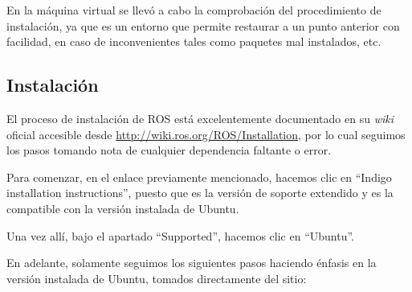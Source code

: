 En la máquina virtual se llevó a cabo la comprobación del procedimiento de instalación, ya que es un entorno que permite restaurar a un punto anterior con facilidad, en caso de inconvenientes tales como paquetes mal instalados, etc.

\subsection{Instalación}

El proceso de instalación de ROS está excelentemente documentado en su \textit{wiki} oficial accesible desde \url{http://wiki.ros.org/ROS/Installation}, por lo cual seguimos los pasos tomando nota de cualquier dependencia faltante o error.

Para comenzar, en el enlace previamente mencionado, hacemos clic en ``Indigo installation instructions'', puesto que es la versión de soporte extendido y es la compatible con la versión instalada de Ubuntu.

Una vez allí, bajo el apartado ``Supported'', hacemos clic en ``Ubuntu''.

En adelante, solamente seguimos los siguientes pasos haciendo énfasis en la versión instalada de Ubuntu, tomados directamente del sitio:

